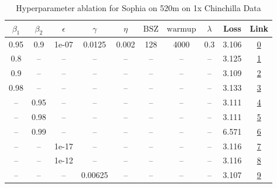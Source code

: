 \begin{table}[H]
\centering
\caption{Hyperparameter ablation for Sophia on 520m on 1x Chinchilla Data}
\label{tab:ablation_sophia_520m_1}
\begin{tabular}{cccccccccc}
\toprule
$\beta_1$ & $\beta_2$ & $\epsilon$ & $\gamma$ & $\eta$ & $\mathrm{BSZ}$ & $\mathrm{warmup}$ & $\lambda$ & Loss & Link \\
\midrule
0.95 & 0.9 & 1e-07 & 0.0125 & 0.002 & 128 & 4000 & 0.3 & 3.106 & \href{https://wandb.ai/stanford-mercury/optimizer-scaling/runs/sweep-520m-10B-sophia651c9blr0.002-wd0.3-minlr0-warmup4000-b10.9-46bf7a}{0} \\
\midrule
0.8 & -- & -- & -- & -- & -- & -- & -- & 3.125 & \href{https://wandb.ai/stanford-mercury/optimizer-scaling/runs/sweep-520m-10B-sophiaded744lr0.002-wd0.3-minlr0-warmup4000-b10.8-48fa58}{1} \\
0.9 & -- & -- & -- & -- & -- & -- & -- & 3.109 & \href{https://wandb.ai/stanford-mercury/optimizer-scaling/runs/sweep-520m-10B-sophiaed133clr0.002-wd0.3-minlr0-warmup4000-b10.9-5c6e5d}{2} \\
0.98 & -- & -- & -- & -- & -- & -- & -- & 3.133 & \href{https://wandb.ai/stanford-mercury/optimizer-scaling/runs/sweep-520m-10B-sophia573a3clr0.002-wd0.3-minlr0-warmup4000-b10.9-b85ec2}{3} \\
-- & 0.95 & -- & -- & -- & -- & -- & -- & 3.111 & \href{https://wandb.ai/stanford-mercury/optimizer-scaling/runs/sweep-520m-10B-sophiad6af81lr0.002-wd0.3-minlr0-warmup4000-b10.9-529318}{4} \\
-- & 0.98 & -- & -- & -- & -- & -- & -- & 3.111 & \href{https://wandb.ai/stanford-mercury/optimizer-scaling/runs/sweep-520m-10B-sophia216d9elr0.002-wd0.3-minlr0-warmup4000-b10.9-9d3974}{5} \\
-- & 0.99 & -- & -- & -- & -- & -- & -- & 6.571 & \href{https://wandb.ai/stanford-mercury/optimizer-scaling/runs/sweep-520m-10B-sophia96c899lr0.002-wd0.3-minlr0-warmup4000-b10.9-44bd90}{6} \\
-- & -- & 1e-17 & -- & -- & -- & -- & -- & 3.116 & \href{https://wandb.ai/stanford-mercury/optimizer-scaling/runs/sweep-520m-10B-sophia7e95a0lr0.002-wd0.3-minlr0-warmup4000-b10.9-a73991}{7} \\
-- & -- & 1e-12 & -- & -- & -- & -- & -- & 3.116 & \href{https://wandb.ai/stanford-mercury/optimizer-scaling/runs/sweep-520m-10B-sophia60cf61lr0.002-wd0.3-minlr0-warmup4000-b10.9-29e8f1}{8} \\
-- & -- & -- & 0.00625 & -- & -- & -- & -- & 3.107 & \href{https://wandb.ai/stanford-mercury/optimizer-scaling/runs/sweep-520m-10B-sophia3cb06elr0.002-wd0.3-minlr0-warmup4000-b10.9-fe954a}{9} \\

\end{tabular}
\end{table}
